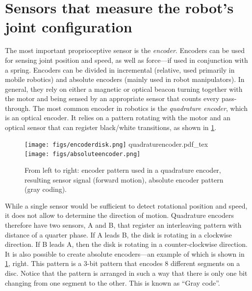 
\section{Sensors that measure the robot's joint configuration}\label{sec:sensors:encoders}

The most important proprioceptive sensor is the \textsl{encoder}. Encoders can be used for sensing joint position and speed, as well as force---if used in conjunction with a spring. Encoders can be divided in incremental (relative, used primarily in mobile robotics) and absolute encoders (mainly used in robot manipulators).
In general, they rely on either a magnetic or optical beacon turning together with the motor and being sensed by an appropriate sensor that counts every pass-through. The most common encoder in robotics is the \textsl{quadrature encoder}, which is an optical encoder. It relies on a pattern rotating with the motor and an optical sensor that can register black/white transitions, as shown in \cref{fig:encoders}.

\begin{figure}
	\centering
		\texttt{[image: figs/encoderdisk.png]}
		\fontsize{7pt}{9pt}\selectfont		
		\def\svgwidth{0.3\textwidth}
    {quadraturencoder.pdf_tex}	
		\texttt{[image: figs/absoluteencoder.png]}
	\caption{From left to right: encoder pattern used in a quadrature encoder, resulting sensor signal (forward motion), absolute encoder pattern (gray coding).}
	\label{fig:encoders}
\end{figure}

While a single sensor would be sufficient to detect rotational position and speed, it does not allow to determine the direction of motion. Quadrature encoders therefore have two sensors, A and B, that register an interleaving pattern with distance of a quarter phase. If A leads B, the disk is rotating in a clockwise direction. If B leads A, then the disk is rotating in a counter-clockwise direction. It is also possible to create absolute encoders---an example of which is shown in \cref{fig:encoders}, right. This pattern is a 3-bit pattern that encodes 8 different segments on a disc. Notice that the pattern is arranged in such a way that there is only one bit changing from one segment to the other. This is known as ``Gray code''.

